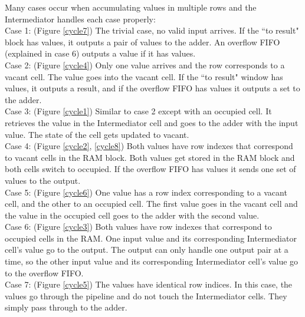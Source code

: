 \par Many cases occur when accumulating values in multiple rows and the Intermediator handles each case properly:
\\\indent Case 1: (Figure \ref{cycle7}) The trivial case, no valid input arrives. If the ``to result" block has values, it outputs a pair of values to the adder. An overflow FIFO (explained in case 6) outputs a value if it has values.
\\\indent Case 2: (Figure \ref{cycle4}) Only one value arrives and the row corresponds to a vacant cell. The value goes into the vacant cell. If the ``to result" window has values, it outputs a result, and if the overflow FIFO has values it outputs a set to the adder.
\\\indent Case 3: (Figure \ref{cycle1}) Similar to case 2 except with an occupied cell. It retrieves the value in the Intermediator cell and goes to the adder with the input value. The state of the cell gets updated to vacant.
\\\indent Case 4: (Figure \ref{cycle2}, \ref{cycle8}) Both values have row indexes that correspond to vacant cells in the RAM block. Both values get stored in the RAM block and both cells switch to occupied. If the overflow FIFO has values it sends one set of values to the output. 
\\\indent Case 5: (Figure \ref{cycle6}) One value has a row index corresponding to a vacant cell, and the other to an occupied cell. The first value goes in the vacant cell and the value in the occupied cell goes to the adder with the second value. 
\\\indent Case 6: (Figure \ref{cycle3}) Both values have row indexes that correspond to occupied cells in the RAM. One input value and its corresponding Intermediator cell's value go to the output. The output can only handle one output pair at a time, so the other input value and its corresponding Intermediator cell's value go to the overflow FIFO.
\\\indent Case 7: (Figure \ref{cycle5}) The values have identical row indices. In this case, the values go through the pipeline and do not touch the Intermediator cells. They simply pass through to the adder.\\
%
